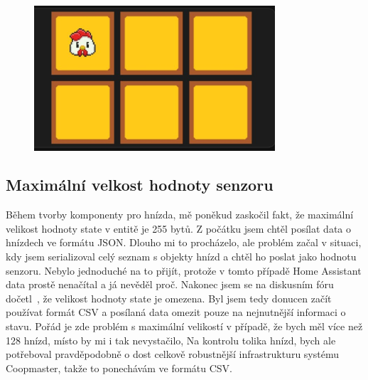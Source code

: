 \begin{figure}[H]
    \centering
    \includegraphics[width=0.8\textwidth]{img/homeassitant_custom_component}
    \label{fig:homeassitant_custom_component}
\end{figure}



\subsection*{Maximální velkost hodnoty senzoru}
Během tvorby komponenty pro hnízda, mě poněkud zaskočil fakt, že maximální velikost hodnoty state v entitě je 255 bytů.
Z počátku jsem chtěl posílat data o hnízdech ve formátu JSON.
Dlouho mi to procházelo, ale problém začal v situaci, kdy jsem serializoval celý seznam s objekty hnízd a chtěl ho poslat jako hodnotu senzoru.
Nebylo jednoduché na to přijít, protože v tomto případě Home Assistant data prostě nenačítal a já nevěděl proč.
Nakonec jsem se na diskusním fóru dočetl~\cite{HAStateLimit255}, že velikost hodnoty state je omezena.
Byl jsem tedy donucen začít používat formát CSV a posílaná data omezit pouze na nejnutnější informaci o stavu.
Pořád je zde problém s maximální velikostí v případě, že bych měl více než 128 hnízd, místo by mi i tak nevystačilo,
Na kontrolu tolika hnízd, bych ale potřeboval pravděpodobně o dost celkově robustnější infrastrukturu systému Coopmaster, takže to ponechávám ve formátu CSV.


